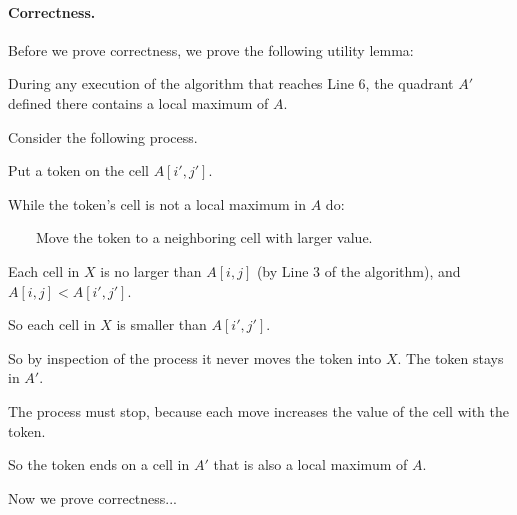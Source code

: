 \paragraph{Correctness.}
Before we prove correctness, we prove the following utility lemma:
\begin{lemma}\label{dc: lemma: utility}
  During any execution of the algorithm that reaches Line 6,
  the quadrant $A'$ defined there contains a local maximum of $A$.
\end{lemma}
\begin{longFormProof}
  \step Consider the following process.
  
  \begin{myframed}
    \begin{steps}
    \item[~(i)] Put a token on the cell $A[i', j']$.

    \item[\,(ii)] While the token's cell is not a local maximum in $A$ do:

    \item[(iii)]~~~~Move the token to a neighboring cell with larger value.
    \end{steps}
  \end{myframed}

  \step Each cell in $X$ is no larger than $A[i,j]$ (by Line 3 of the algorithm), and $A[i, j] < A[i',j']$.

  \step So each cell in $X$ is smaller than $A[i', j']$.

  \step So by inspection of the process it never moves the token into $X$.  The token stays in $A'$.

  \step The process must stop, because each move increases the value of the cell with the token.

  \step So the token ends on a cell in $A'$ that is also a local maximum of $A$.
\end{longFormProof}

Now we prove correctness...

